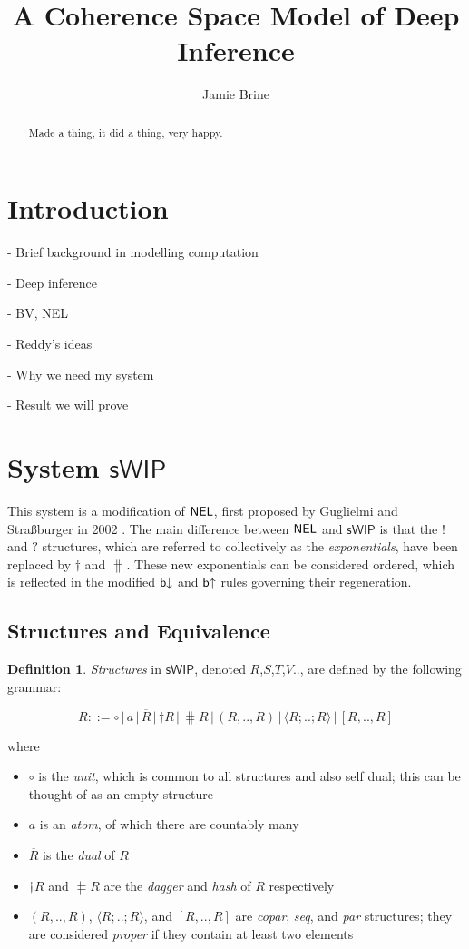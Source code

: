 \documentclass[11pt, oneside]{article}
\title{A Coherence Space Model of Deep Inference}
\author{Jamie Brine}
\theoremstyle{plain}
\theoremstyle{definition}
\newtheorem{definition}[theorem]{Definition}
\let\originaldagger\dagger
\renewcommand{\dag}{\mathord{\originaldagger}}
\newcommand{\la}{\langle}
\newcommand{\ra}{\rangle}
\newcommand{\sSys}{{\mathsf{sWIP}}}%
\newcommand{\unit}{\circ}
\begin{document}
\maketitle

\begin{abstract}
    Made a thing, it did a thing, very happy.
\end{abstract}

\newpage
\tableofcontents

\newpage
\section{Introduction}

- Brief background in modelling computation

- Deep inference

- BV, NEL

- Reddy's ideas

- Why we need my system

- Result we will prove

\newpage
\section{System $\sSys$}

This system is a modification of ${\mathsf{NEL}}$, first proposed by Guglielmi and Straßburger in 2002 \cite{guglielmi2002non}.
The main difference between ${\mathsf{NEL}}$ and $\sSys$ is that the $!$ and $?$ structures, which are referred to collectively as the \textit{exponentials}, have been replaced by $\dag$ and $\hash$.
These new exponentials can be considered ordered, which is reflected in the modified ${\mathsf b}{\downarrow}$ and ${\mathsf b}{ \uparrow}$ rules governing their regeneration.

\subsection{Structures and Equivalence}

\begin{definition}
\textit{Structures} in $\sSys$, denoted $R$,$S$,$T$,$V$.., are defined by the following grammar:

\[R ::= \unit \,|\, a \,|\, \overline{R} \,|\, \dag R \,|\, \hash R \,|\, (R,..,R) \,|\, \la R;..;R\ra \,|\, [R,..,R]\]

where
\begin{itemize}
\item $\unit$ is the \textit{unit}, which is common to all structures and also self dual; this can be thought of as an empty structure
\item $a$ is an \textit{atom}, of which there are countably many
\item $\overline{R}$ is the \textit{dual} of $R$
\item $\dag R$ and $\hash R$ are the \textit{dagger} and \textit{hash} of $R$ respectively
\item $(R,..,R)$, $\la R;..;R\ra$, and $[R,..,R]$ are \textit{copar}, \textit{seq}, and \textit{par} structures; they are considered \textit{proper} if they contain at least two elements
\end{itemize}
\end{definition}
\end{document}
